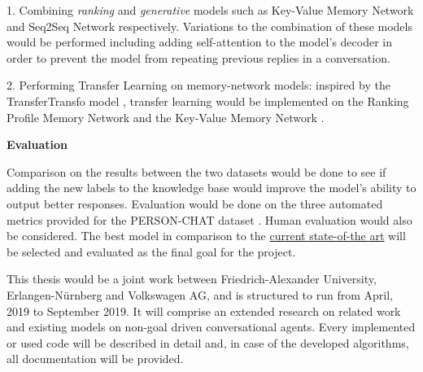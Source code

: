 \documentclass[paper=a4,11pt,parskip=half,toc=listof]{scrartcl}
\begin{document}
	1. Combining \emph{ranking} and \emph{generative} models such as Key-Value Memory Network \cite{miller2016key, sukhbaatar2015end} and Seq2Seq Network \cite{sutskever2014sequence} respectively. Variations to the combination of these models would be performed including adding self-attention \cite{vaswani2017attention, shao2017generating} to the model's decoder in order to prevent the model from repeating previous replies in a conversation.
	
	2. Performing Transfer Learning on memory-network models:
	inspired by the TransferTransfo model \cite{wolf2019transfertransfo, radford2018improving}, transfer learning would be implemented on the Ranking Profile Memory Network and the Key-Value Memory Network \cite{miller2016key}.
	
	\textbf{\normalsize {Evaluation}}
	
	Comparison on the results between the two datasets would be done to see if adding the new labels to the knowledge base would improve the model's ability to output better responses.
	Evaluation would be done on the three automated metrics provided for the PERSON-CHAT dataset \cite{zhang2018personalizing}. Human evaluation would also be considered. The best model in comparison to the \href{(http://convai.io)}{current state-of-the art} will be selected and evaluated as the final goal for the project.	
	
	This thesis would be a joint work between Friedrich-Alexander University, Erlangen-Nürnberg and Volkswagen AG, and is structured to run from April, 2019 to September 2019. It will comprise an extended research on related work and existing models on non-goal driven conversational agents. Every implemented or used code will be described in detail and, in case of the developed algorithms, all documentation will be provided. 
	
	
	
	
\end{document}
